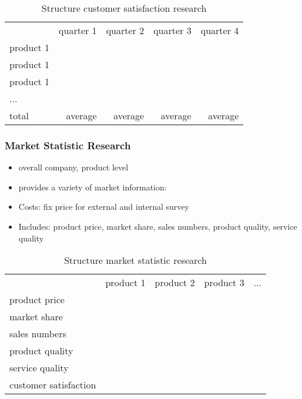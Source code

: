 \documentclass[11pt,titlepage,oneside,openany]{book}
\begin{document}
    \begin{table}[ht]
    \centering
    \begin{tabular}{|l|r|r|r|r|}
    \hline
                & quarter 1   & quarter 2  & quarter 3 & quarter 4 \\
    product 1   &             &            &           &           \\
    product 1   &             &            &           &           \\
    product 1   &             &            &           &           \\
    ...         &             &            &           &           \\
    total       & average     & average    & average   & average   \\
    \hline
    \end{tabular}
    \caption{Structure customer satisfaction research}
    \label{MR_customer_satisfaction}
    \end{table}
    
\subsubsection{Market Statistic Research}
    \begin{itemize}
        \item overall company, product level
        \item provides a variety of market information: 
        \item Costs: fix price for external and internal survey
        \item Includes: product price, market share, sales numbers, product quality, service quality 
    \end{itemize}
    
    \begin{table}[ht]
    \centering
    \begin{tabular}{|l|r|r|r|r|}
    \hline
                            & product 1   & product 2  & product 3 & ...       \\
    product price           &             &            &           &           \\
    market share            &             &            &           &           \\
    sales numbers           &             &            &           &           \\
    product quality         &             &            &           &           \\
    service quality         &             &            &           &           \\
    customer satisfaction   &             &            &           &           \\
    \hline
    \end{tabular}
    \caption{Structure market statistic research}
    \label{MR_market_statistic}
    \end{table}
    
\end{document}

